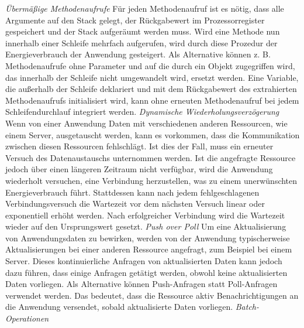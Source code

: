 \documentclass[utf8,biblatex]{lni}
\begin{document}
\newline \newline \textit{Übermäßige Methodenaufrufe} \newline
Für jeden Methodenaufruf ist es nötig, dass alle Argumente auf den Stack gelegt, der Rückgabewert im Prozessorregister gespeichert und der Stack aufgeräumt werden muss. Wird eine Methode nun innerhalb einer Schleife mehrfach aufgerufen, wird durch diese Prozedur der Energieverbrauch der Anwendung gesteigert. Als Alternative können z. B. Methodenaufrufe ohne Parameter und auf die durch ein Objekt zugegriffen wird, das innerhalb der Schleife nicht umgewandelt wird, ersetzt werden. Eine Variable, die außerhalb der Schleife deklariert und mit dem Rückgabewert des extrahierten Methodenaufrufs initialisiert wird, kann ohne erneuten Methodenaufruf bei jedem Schleifendurchlauf integriert werden. \cite{Calero21}
\newline \newline \textit{Dynamische Wiederholungsverzögerung} \newline
Wenn von einer Anwendung Daten mit verschiedenen anderen Ressourcen, wie einem Server, ausgetauscht werden, kann es vorkommen, dass die Kommunikation zwischen diesen Ressourcen fehlschlägt. Ist dies der Fall, muss ein erneuter Versuch des Datenaustauschs unternommen werden. Ist die angefragte Ressource jedoch über einen längeren Zeitraum nicht verfügbar, wird die Anwendung wiederholt versuchen, eine Verbindung herzustellen, was zu einem unerwünschten Energieverbrauch führt. Stattdessen kann nach jedem fehlgeschlagenen Verbindungsversuch die Wartezeit vor dem nächsten Versuch linear oder exponentiell erhöht werden. Nach erfolgreicher Verbindung wird die Wartezeit wieder auf den Ursprungswert gesetzt. \cite{Calero21}
\newline \newline \textit{Push over Poll} \newline
Um eine Aktualisierung von Anwendungsdaten zu bewirken, werden von der Anwendung typischerweise Aktualisierungen bei einer anderen Ressource angefragt, zum Beispiel bei einem Server. Dieses kontinuierliche Anfragen von aktualisierten Daten kann jedoch dazu führen, dass einige Anfragen getätigt werden, obwohl keine aktualisierten Daten vorliegen. Als Alternative können Push-Anfragen statt Poll-Anfragen verwendet werden. Das bedeutet, dass die Ressource aktiv Benachrichtigungen an die Anwendung versendet, sobald aktualisierte Daten vorliegen. \cite{Calero21}
\newline \newline \textit{Batch-Operationen} \newline
\end{document}
